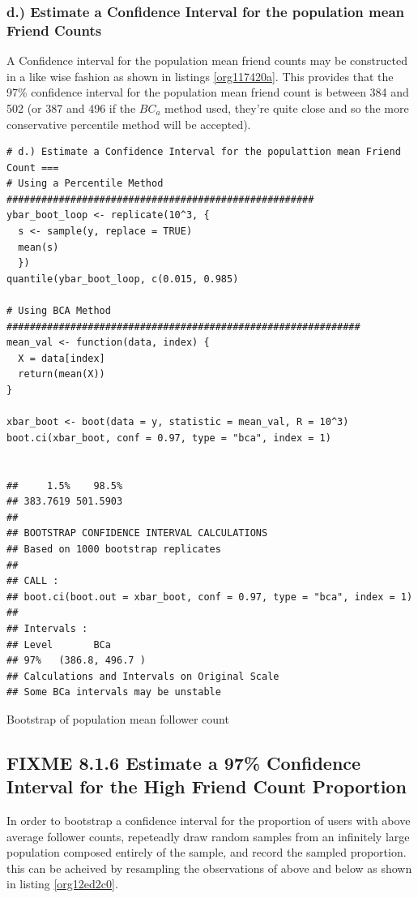 \documentclass[11pt]{article}
\begin{document}
\subsubsection{d.) Estimate a Confidence Interval for the population mean Friend Counts}
\label{sec:org98d0be7}
A Confidence interval for the population mean friend counts may be constructed in a like wise fashion as shown in listings \ref{org117420a}. This provides that the 97\% confidence interval for the population mean friend count is between 384 and 502 (or 387 and 496 if the \(BC_{a}\) method used, they're quite close and so the more conservative percentile method will be accepted).

\begin{listing}[htbp]
\begin{verbatim}
# d.) Estimate a Confidence Interval for the populattion mean Friend Count ===
# Using a Percentile Method #####################################################
ybar_boot_loop <- replicate(10^3, {
  s <- sample(y, replace = TRUE)
  mean(s)
  })
quantile(ybar_boot_loop, c(0.015, 0.985)

# Using BCA Method #############################################################
mean_val <- function(data, index) {
  X = data[index]
  return(mean(X))
}

xbar_boot <- boot(data = y, statistic = mean_val, R = 10^3)
boot.ci(xbar_boot, conf = 0.97, type = "bca", index = 1)


##     1.5%    98.5%
## 383.7619 501.5903
##
## BOOTSTRAP CONFIDENCE INTERVAL CALCULATIONS
## Based on 1000 bootstrap replicates
##
## CALL :
## boot.ci(boot.out = xbar_boot, conf = 0.97, type = "bca", index = 1)
##
## Intervals :
## Level       BCa
## 97%   (386.8, 496.7 )
## Calculations and Intervals on Original Scale
## Some BCa intervals may be unstable
\end{verbatim}
\caption{\label{org117420a}Bootstrap of population mean follower count}
\end{listing}

\subsection{{\bfseries\sffamily FIXME} 8.1.6 Estimate a 97\% Confidence Interval for the High Friend Count Proportion}
\label{sec:org84fb543}
In order to bootstrap a confidence interval for the proportion of users with
above average follower counts, repeteadly draw random samples from an infinitely
large population composed entirely of the sample, and record the sampled
proportion. this can be acheived by resampling the observations of above and
below as shown in listing \ref{org12ed2c0}.
\end{document}
